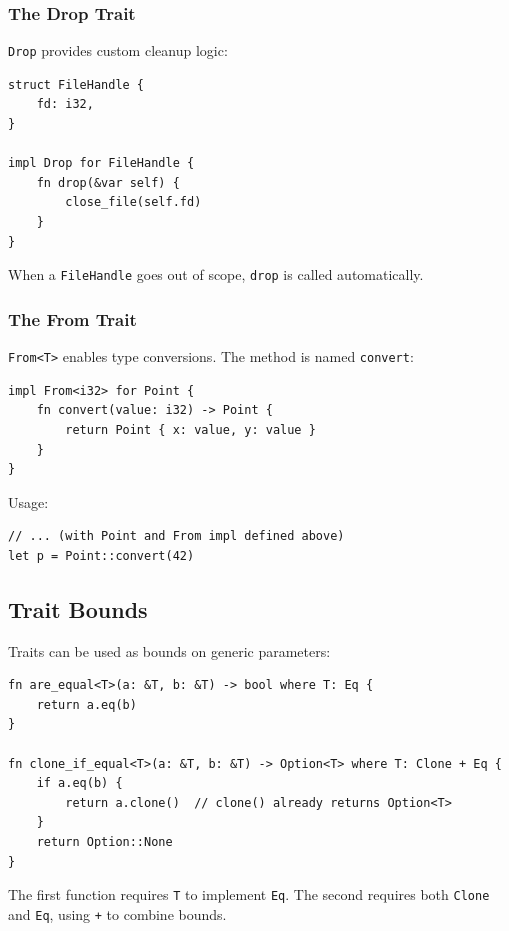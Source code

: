 \subsubsection{The Drop Trait}

\texttt{Drop} provides custom cleanup logic:

\begin{lstlisting}
struct FileHandle {
    fd: i32,
}

impl Drop for FileHandle {
    fn drop(&var self) {
        close_file(self.fd)
    }
}
\end{lstlisting}

When a \texttt{FileHandle} goes out of scope, \texttt{drop} is called automatically.

\subsubsection{The From Trait}

\texttt{From<T>} enables type conversions. The method is named \texttt{convert}:

\begin{lstlisting}
impl From<i32> for Point {
    fn convert(value: i32) -> Point {
        return Point { x: value, y: value }
    }
}
\end{lstlisting}

Usage:

\begin{lstlisting}
// ... (with Point and From impl defined above)
let p = Point::convert(42)
\end{lstlisting}

\subsection{Trait Bounds}

Traits can be used as bounds on generic parameters:

\begin{lstlisting}
fn are_equal<T>(a: &T, b: &T) -> bool where T: Eq {
    return a.eq(b)
}

fn clone_if_equal<T>(a: &T, b: &T) -> Option<T> where T: Clone + Eq {
    if a.eq(b) {
        return a.clone()  // clone() already returns Option<T>
    }
    return Option::None
}
\end{lstlisting}

The first function requires \texttt{T} to implement \texttt{Eq}. The second requires both \texttt{Clone} and \texttt{Eq}, using \texttt{+} to combine bounds.

